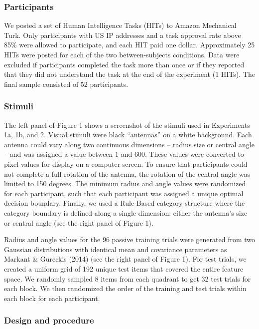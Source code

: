 \documentclass[10pt, letterpaper]{article}
\begin{document}
\subsubsection{Participants}\label{participants}

We posted a set of Human Intelligence Tasks (HITs) to Amazon Mechanical
Turk. Only participants with US IP addresses and a task approval rate
above 85\% were allowed to participate, and each HIT paid one dollar.
Approximately 25 HITs were posted for each of the two between-subjects
conditions. Data were excluded if participants completed the task more
than once or if they reported that they did not understand the task at
the end of the experiment (1 HITs). The final sample consisted of 52
participants.

\subsubsection{Stimuli}\label{stimuli}

The left panel of Figure 1 shows a screenshot of the stimuli used in
Experiments 1a, 1b, and 2. Visual stimuli were black ``antennas'' on a
white background. Each antenna could vary along two continuous
dimensions -- radius size or central angle -- and was assigned a value
between 1 and 600. These values were converted to pixel values for
display on a computer screen. To ensure that participants could not
complete a full rotation of the antenna, the rotation of the central
angle was limited to 150 degrees. The minimum radius and angle values
were randomized for each participant, such that each participant was
assigned a unique optimal decision boundary. Finally, we used a
Rule-Based category structure where the category boundary is defined
along a single dimension: either the antenna's size or central angle
(see the right panel of Figure 1).

Radius and angle values for the 96 passive training trials were
generated from two Gaussian distributions with identical mean and
covariance parameters as Markant \& Gureckis (2014) (see the right panel
of Figure 1). For test trials, we created a uniform grid of 192 unique
test items that covered the entire feature space. We randomly sampled 8
items from each quadrant to get 32 test trials for each block. We then
randomized the order of the training and test trials within each block
for each participant.

\subsubsection{Design and procedure}\label{design-and-procedure}
\end{document}
